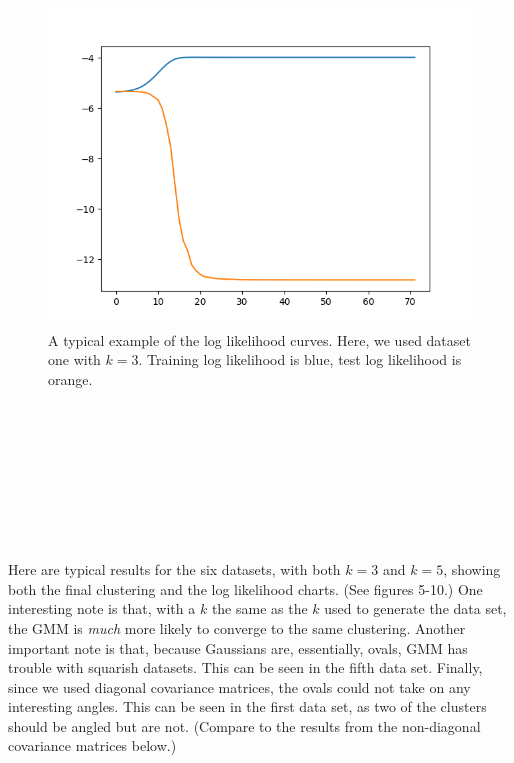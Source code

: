\documentclass{article}
\begin{document}
\begin{figure}[!ht]
	\centering
	\includegraphics[width=120mm]{figs/gmm_ds0_k3_orthog_ll_trial4.png}
	\caption{A typical example of the log likelihood curves. Here, we used dataset one with $k = 3$. 
        Training log likelihood is blue, test log likelihood is orange.}
\end{figure}

~\\
~\\
~\\
~\\
~\\
~\\
~\\
~\\

Here are typical results for the six datasets, with both $k=3$ and $k=5$, 
showing both the final clustering and the log likelihood charts. (See figures 5-10.) One interesting 
note is that, with a $k$ the same as the $k$ used to generate the data set, the 
GMM is \textit{much} more likely to converge to the same clustering. Another 
important note is that, because Gaussians are, essentially, ovals, GMM has 
trouble with squarish datasets. This can be seen in the fifth data set. Finally, 
since we used diagonal covariance matrices, the ovals could not take on any 
interesting angles. This can be seen in the first data 
set, as two of the clusters should be angled but are not. (Compare to the 
results from the non-diagonal covariance matrices below.)
\end{document}
